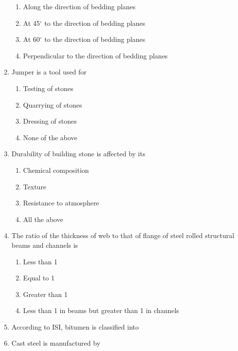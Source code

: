 \documentclass[11pt,a4paper]{article}
\begin{document}
\begin{enumerate}
\begin{enumerate}[label=\Alph*.]
\item{Along the direction of bedding planes}
\item{At 45$^\circ$ to the direction of bedding planes}
\item{At 60$^\circ$ to the direction of bedding planes}
\item{Perpendicular to the direction of bedding planes}
\end{enumerate}
\item{Jumper is a tool used for}
\begin{enumerate}[label=\Alph*.]
\item{Testing of stones}
\item{Quarrying of stones}
\item{Dressing of stones}
\item{None of the above}
\end{enumerate}
\item{Durability of building stone is affected by its}
\begin{enumerate}[label=\Alph*.]
\item{Chemical composition}
\item{Texture}
\item{Resistance to atmosphere}
\item{All the above}
\end{enumerate}
\item{The ratio of the thickness of web to that of flange of steel rolled structural beams and channels is}
\begin{enumerate}[label=\Alph*.]
\item{Less than 1}
\item{Equal to 1}
\item{Greater than 1}
\item{Less than 1 in beams but greater than 1 in channels}
\end{enumerate}
\item{According to ISI, bitumen is classified into}
\\
\item{Cast steel is manufactured by}
\begin{enumerate}[label=\Alph*.]

\end{enumerate}
\end{enumerate}
\end{document}
